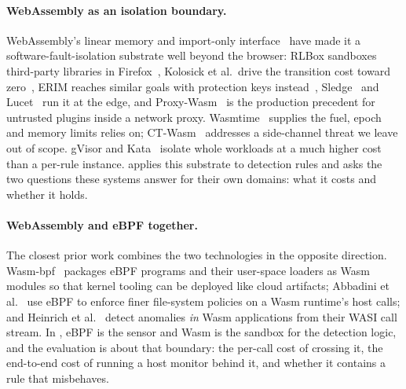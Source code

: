 \paragraph{WebAssembly as an isolation boundary.}
WebAssembly's linear memory and import-only interface~\cite{wasm-spec,wasi}
have made it a software-fault-isolation substrate well beyond the browser:
RLBox sandboxes third-party libraries in Firefox~\cite{rlbox},
Kolosick et al.\ drive the transition cost toward zero~\cite{wasmboxc},
ERIM reaches similar goals with protection keys instead~\cite{erim},
Sledge~\cite{sledge} and Lucet~\cite{lucet} run it at the edge, and
Proxy-Wasm~\cite{proxy-wasm} is the production precedent for untrusted
plugins inside a network proxy. Wasmtime~\cite{wasmtime} supplies the fuel,
epoch and memory limits \sys relies on; CT-Wasm~\cite{ct-wasm} addresses a
side-channel threat we leave out of scope. gVisor and Kata~\cite{gvisor,kata}
isolate whole workloads at a much higher cost than a per-rule instance. \sys
applies this substrate to detection rules and asks the two questions these
systems answer for their own domains: what it costs and whether it holds.

\paragraph{WebAssembly and eBPF together.}
The closest prior work combines the two technologies in the opposite
direction. Wasm-bpf~\cite{wasm-bpf} packages eBPF programs and their
user-space loaders as Wasm modules so that kernel tooling can be deployed like
cloud artifacts; Abbadini et al.~\cite{abbadini-ebpf-wasm} use eBPF to
enforce finer file-system policies on a Wasm runtime's host calls; and
Heinrich et al.~\cite{heinrich-wasm-ids} detect anomalies \emph{in} Wasm
applications from their WASI call stream. In \sys, eBPF is the sensor and Wasm
is the sandbox for the detection logic, and the evaluation is about that
boundary: the per-call cost of crossing it, the end-to-end cost of running a
host monitor behind it, and whether it contains a rule that misbehaves.
